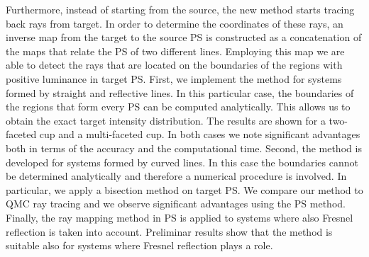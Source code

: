 Furthermore, instead of starting from the source, the new method starts tracing back rays from target. 
In order to determine the coordinates of these rays, an inverse map from the target to the source PS is constructed as a concatenation of the maps that relate the PS of two different lines.
Employing this map we are able to detect the rays that are located on the boundaries of the regions with positive luminance in target PS. 
First, we implement the method for systems formed by straight and reflective lines. In this particular case, the boundaries of the regions that form every PS can be computed analytically. This allows us to obtain the exact target intensity distribution. The results are shown for a two-faceted cup and a multi-faceted cup. In both cases we note significant advantages both in terms of the accuracy and the computational time. Second, the method is developed for systems formed by curved lines. In this case the boundaries cannot be determined analytically and therefore a numerical procedure is involved. In particular, we apply a bisection method on target PS. We compare our method to QMC ray tracing and we observe significant advantages using the PS method. Finally, the ray mapping method in PS is applied to systems where also Fresnel reflection is taken into account. Preliminar results show that the method is suitable also for systems where Fresnel reflection plays a role.